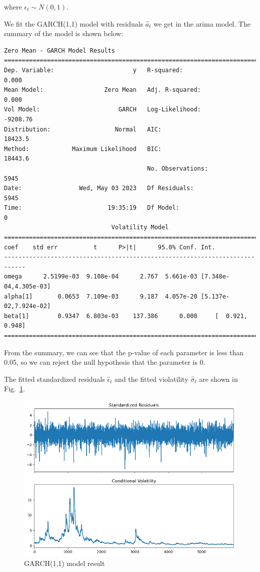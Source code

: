 \documentclass[runningheads]{llncs}
\begin{document}
where $\epsilon_t\sim N(0,1)$.

We fit the GARCH(1,1) model with residuals $\hat{a}_t$ we get in the arima model. The summary of the model is shown below:
\begin{verbatim}
Zero Mean - GARCH Model Results                        
==============================================================================
Dep. Variable:                      y   R-squared:                       0.000
Mean Model:                 Zero Mean   Adj. R-squared:                  0.000
Vol Model:                      GARCH   Log-Likelihood:               -9208.76
Distribution:                  Normal   AIC:                           18423.5
Method:            Maximum Likelihood   BIC:                           18443.6
                                        No. Observations:                 5945
Date:                Wed, May 03 2023   Df Residuals:                     5945
Time:                        19:35:19   Df Model:                            0
                              Volatility Model                              
============================================================================             coef    std err          t      P>|t|      95.0% Conf. Int.
----------------------------------------------------------------------------
omega      2.5199e-03  9.108e-04      2.767  5.661e-03 [7.348e-04,4.305e-03]
alpha[1]       0.0653  7.109e-03      9.187  4.057e-20 [5.137e-02,7.924e-02]
beta[1]        0.9347  6.803e-03    137.386      0.000     [  0.921,  0.948]
============================================================================
\end{verbatim}

From the summary, we can see that the p-value of each parameter is less than 0.05, so we can reject the null hypothesis that the parameter is 0.

The fitted standardized residuals $\hat{\epsilon}_t$ and
the fitted violatility $\hat{\sigma}_t$ are shown in Fig.~\ref{fig:9}.


\begin{figure}[htbp]
    \centering
    \includegraphics[width=\textwidth]{../img/garch_result.png}
    \caption{GARCH(1,1) model result}
    \label{fig:9}
\end{figure}
\end{document}
